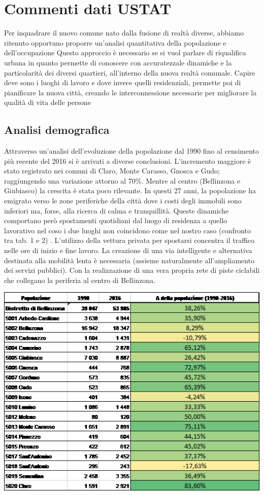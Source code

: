\section{Commenti dati USTAT}
Per inquadrare il nuovo comune nato dalla fusione di realtà diverse, abbiamo ritenuto opportuno proporre un’analisi quantitativa della popolazione e dell’occupazione 
Questo approccio  è necessario se si vuol parlare di riqualifica urbana in quanto permette di conoscere con accuratezzale dinamiche e la particolarità dei diversi quartieri, all’interno della nuova realtà comunale. Capire deve sono i luoghi di lavoro e dove invece quelli residenziali, permette poi di pianificare la nuova città, creando le interconnessione necessarie per migliorare la qualità di vita delle persone

\subsection{Analisi demografica}
Attraverso un’analisi dell’evoluzione della popolazione dal 1990 fino al censimento più recente del 2016 si è arrivati a diverse conclusioni. L’incremento maggiore è stato registrato  nei comuni di Claro, Monte Carasso, Gnosca e Gudo; raggiungendo una variazione attorno al 70\%.  Mentre al centro (Bellinzona e Giubiasco) la crescita è stata poco rilevante. In questi 27 anni, la popolazione ha emigrato verso le zone periferiche della città dove i costi degli immobili sono inferiori ma, forse, alla ricerca di calma e tranquillità. Queste dinamiche comportano però spostamenti quotidiani dal luogo di residenza a quello lavorativo nel coso i due luoghi non coincidono come nel nostro caso (confronto tra tab. 1 e 2) . L’utilizzo della vettura privata per spostarsi concentra il traffico nelle ore di inizio e fine lavoro. La creazione di una via intelligente e alternativa destinata alla mobilità lenta è necessaria (assieme naturalmente all’ampliamento dei servizi pubblici). Con la realizzazione di una vera propria rete di piste ciclabili che collegano la periferia al centro di Bellinzona.

\includegraphics[scale=0.5]{Capitoli/immagine progetto.png}

